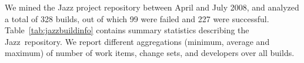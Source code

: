 \documentclass[12pt,oneside]{book}
\newcommand\tm{\texttrademark}
\begin{document}
%
%
%
%

We mined the Jazz project repository between April and July 2008, and analyzed a
total of 328 builds, out of which 99 were failed and 227 were successful.
Table~\ref{tab:jazzbuildinfo} contains summary statistics describing the Jazz\tm\
repository. We report different aggregations (minimum, average and maximum) of
number of work items, change sets, and developers over all builds. 



\end{document}
